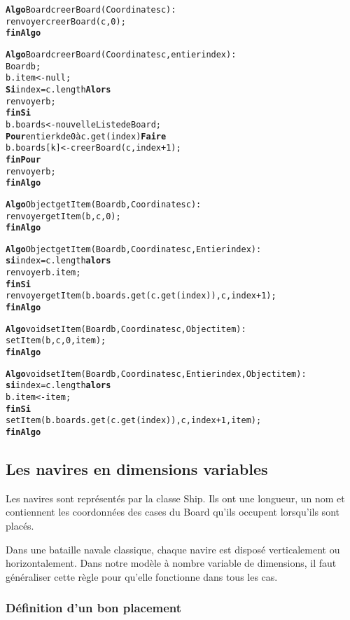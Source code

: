 \begin{alltt}
{\bf Algo} Board creerBoard(Coordinates c) :
    renvoyer creerBoard(c, 0);
{\bf finAlgo}

{\bf Algo} Board creerBoard(Coordinates c, entier index) :
    Board b;
    b.item <- null;
    {\bf Si} index = c.length {\bf Alors}
        renvoyer b;
    {\bf finSi}
    b.boards <- nouvelle Liste de Board;
    {\bf Pour} entier k de 0 à c.get(index) {\bf Faire}
        b.boards[k] <- creerBoard(c, index + 1);
    {\bf finPour}
    renvoyer b;
{\bf finAlgo}

{\bf Algo} Object getItem(Board b, Coordinates c) :
    renvoyer getItem(b, c, 0);
{\bf finAlgo}


{\bf Algo} Object getItem(Board b, Coordinates c, Entier index) :
    {\bf si} index = c.length {\bf alors}
        renvoyer b.item;
    {\bf finSi}
    renvoyer getItem(b.boards.get(c.get(index)), c, index + 1);
{\bf finAlgo}

{\bf Algo} voidsetItem(Board b, Coordinates c, Object item) :
    setItem(b, c, 0, item);
{\bf finAlgo}

{\bf Algo} void setItem(Board b, Coordinates c, Entier index, Object item) :
    {\bf si} index = c.length {\bf alors}
        b.item <- item;
    {\bf finSi}
    setItem(b.boards.get(c.get(index)), c, index + 1, item);
{\bf finAlgo}
\end{alltt}

\subsection{Les navires en dimensions variables}
	Les navires sont représentés par la classe Ship. Ils ont une longueur, un nom et contiennent les coordonnées des cases du Board qu'ils occupent lorsqu'ils sont placés. \newline

	Dans une bataille navale classique, chaque navire est disposé verticalement ou horizontalement. Dans notre modèle à nombre variable de dimensions, il faut généraliser cette règle pour qu'elle fonctionne dans tous les cas.

\subsubsection{Définition d'un bon placement}

